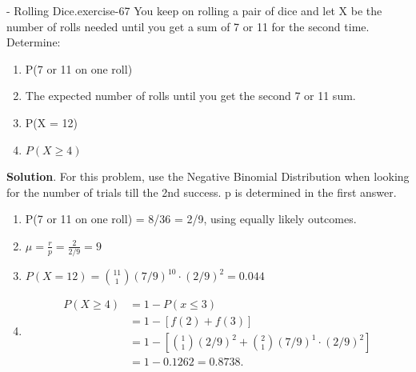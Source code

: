 \documentclass[10pt,]{book}
\numberwithin{equation}{section}
\begin{document}
\begin{inlineexercise}{- Rolling Dice.}{exercise-67}%
\hypertarget{p-1017}{}%
You keep on rolling a pair of dice and let X be the number of rolls needed until you get a sum of 7 or 11 for the second time. Determine: \leavevmode%
\begin{enumerate}
\item\hypertarget{li-266}{}P(7 or 11 on one roll)%
\item\hypertarget{li-267}{}The expected number of rolls until you get the second 7 or 11 sum.%
\item\hypertarget{li-268}{}P(X = 12)%
\item\hypertarget{li-269}{}\(P(X \ge 4)\)%
\end{enumerate}
%
\textbf{Solution}.\quad%
\hypertarget{p-1018}{}%
For this problem, use the Negative Binomial Distribution when looking for the number of trials till the 2nd success. p is determined in the first answer. \leavevmode%
\begin{enumerate}
\item\hypertarget{li-270}{}P(7 or 11 on one roll) = 8/36 = 2/9, using equally likely outcomes.%
\item\hypertarget{li-271}{}\(\mu = \frac{r}{p} = \frac{2}{2/9} = 9\)%
\item\hypertarget{li-272}{}\(P( X = 12) = \binom{11}{1} (7/9)^10 \cdot (2/9)^2 = 0.044\)%
\item\hypertarget{li-273}{}%
\begin{align*}
P(X \ge 4) & = 1- P(x \le 3) \\
& = 1 - [ f(2) + f(3) ]\\
& = 1 - \left[ \binom{1}{1} (2/9)^2 + \binom{2}{1} (7/9)^1 \cdot (2/9)^2 \right ]\\
& = 1 - 0.1262 = 0.8738.
\end{align*}
%
\end{enumerate}
%
\end{inlineexercise}
%
\par
\hypertarget{p-1019}{}%
\end{document}
